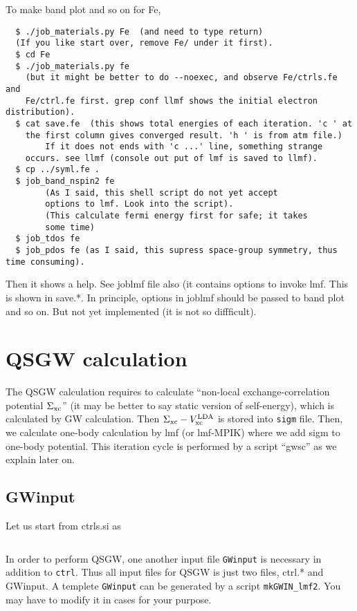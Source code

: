 \documentclass[a4paper,10pt,epsf,fleqn]{article}
\begin{document}
To make band plot and so on for Fe,
\begin{verbatim}
  $ ./job_materials.py Fe  (and need to type return)
  (If you like start over, remove Fe/ under it first).
  $ cd Fe
  $ ./job_materials.py fe
    (but it might be better to do --noexec, and observe Fe/ctrls.fe and
	Fe/ctrl.fe first. grep conf llmf shows the initial electron distribution).
  $ cat save.fe  (this shows total energies of each iteration. 'c ' at
	the first column gives converged result. 'h ' is from atm file.)
        If it does not ends with 'c ...' line, something strange
	occurs. see llmf (console out put of lmf is saved to llmf).
  $ cp ../syml.fe .
  $ job_band_nspin2 fe 
        (As I said, this shell script do not yet accept
	    options to lmf. Look into the script).
        (This calculate fermi energy first for safe; it takes
	    some time)       
  $ job_tdos fe
  $ job_pdos fe (as I said, this supress space-group symmetry, thus time consuming).
\end{verbatim}
Then it shows a help. 
See joblmf file also (it contains options to invoke lmf. This is shown
in save.*. In principle, options in joblmf should be passed to band plot
and so on. But not yet implemented (it is not so diffficult).



\newpage
\section{QSGW calculation}
The QSGW calculation requires to calculate ``non-local exchange-correlation
potential $\Sigma_{\rm xc}$'' (it may be better to say static version of self-energy), which is
calculated by GW calculation. Then $\Sigma_{\rm xc}-V_{\rm xc}^{\rm
LDA}$ is stored into \verb+sigm+ file. Then, we calculate one-body
calculation by lmf (or lmf-MPIK) where we add sigm to one-body
potential. This iteration cycle is performed by a script ``gwsc'' as we
explain later on.

\subsection{GWinput}
Let us start from ctrls.si as
\begin{verbatim}

\end{verbatim}

\label{GWinput}
In order to perform QSGW, one another input file 
\verb+GWinput+ is necessary in addition to \verb+ctrl+.
Thus all input files for QSGW is just two files, ctrl.* and GWinput.
A templete \verb+GWinput+ can be generated by a script \verb+mkGWIN_lmf2+. 
You may have to modify it in cases for your purpose.
\end{document}
